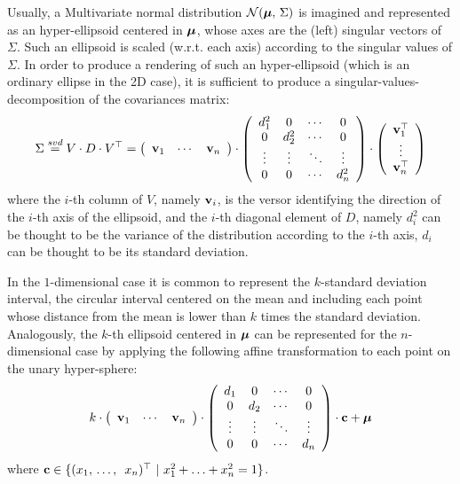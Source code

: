	Usually, a Multivariate normal distribution $\mathcal{N}(\boldsymbol{\mathrm{{\mu}}},\, \Sigma)$ is imagined and represented as an hyper-ellipsoid centered in $\boldsymbol{\mathrm{{\mu}}}$, whose axes are the (left) singular vectors of $\Sigma$. Such an ellipsoid is scaled (w.r.t. each axis) according to the singular values of $\Sigma$.
	In order to produce a rendering of such an hyper-ellipsoid (which is an ordinary ellipse in the 2D case), it is sufficient to produce a singular-values-decomposition of the covariances matrix:
	\[
		\Sigma \stackrel{svd}{=} V \cdot D \cdot V^\top = 
		\left(\begin{array}{ccc}
			\boldsymbol{\mathrm{{v}}}_1 & \cdots & \boldsymbol{\mathrm{{v}}}_n
		\end{array}\right)
		\cdot
		\left(\begin{array}{cccc}
			d_1^2 & 0 & \cdots & 0 \\
			0 & d_2^2 & \cdots & 0 \\
			\vdots & \vdots & \ddots & \vdots \\
			0 & 0 & \cdots & d_n^2
		\end{array}\right)
		\cdot
		\left(\begin{array}{c}
			\boldsymbol{\mathrm{{v}}}_1^\top \\
			\vdots \\
			\boldsymbol{\mathrm{{v}}}_n^\top
		\end{array}\right)
	\]
	where the $i$-th column of $V$, namely $\boldsymbol{\mathrm{{v}}}_i$, is the versor identifying the direction of the $i$-th axis of the ellipsoid, and the $i$-th diagonal element of $D$, namely $d_i^2$ can be thought to be the variance of the distribution according to the $i$-th axis, \ie{} $d_i$ can be thought to be its standard deviation.
	
	In the $1$-dimensional case it is common to represent the $k$-standard deviation interval, \ie{} the circular interval centered on the mean and including each point whose distance from the mean is lower than $k$ times the standard deviation. Analogously, the $k$-th ellipsoid centered in $\boldsymbol{\mathrm{{\mu}}}$ can be represented for the $n$-dimensional case by applying the following affine transformation to each point on the unary hyper-sphere:
	\[
		k \cdot 
		\left(\begin{array}{ccc}
			\boldsymbol{\mathrm{{v}}}_1 & \cdots & \boldsymbol{\mathrm{{v}}}_n
		\end{array}\right)
		\cdot
		\left(\begin{array}{cccc}
			d_1 & 0 & \cdots & 0 \\
			0 & d_2 & \cdots & 0 \\
			\vdots & \vdots & \ddots & \vdots \\
			0 & 0 & \cdots & d_n
		\end{array}\right)
		\cdot
		\boldsymbol{\mathrm{{c}}} + \boldsymbol{\mathrm{{\mu}}}
	\]
	where $\vect{c} \in \{ (x_1,\, \ldots,\,\ x_n)^\top \ |\  x_1^2 + \ldots + x_n^2 = 1 \}$.